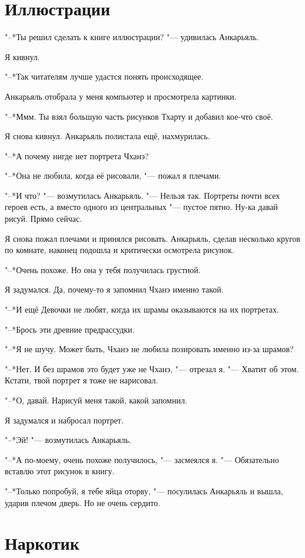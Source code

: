 \documentclass[a4paper,10pt]{book}
\newcommand{\ldotst}{\so{...}\xspace}
\begin{document}
\section{Иллюстрации}

"--*Ты решил сделать к книге иллюстрации? "--- удивилась Анкарьяль.

Я кивнул.

"--*Так читателям лучше удастся понять происходящее.

Анкарьяль отобрала у меня компьютер и просмотрела картинки.

"--*Ммм. Ты взял большую часть рисунков Тхарту и добавил кое-что своё.

Я снова кивнул. Анкарьяль полистала ещё, нахмурилась.

"--*А почему нигде нет портрета Чханэ?

"--*Она не любила, когда её рисовали, "--- пожал я плечами.

"--*И что? "--- возмутилась Анкарьяль. "--- Нельзя так. Портреты почти всех 
героев есть, а вместо одного из центральных "--- пустое пятно. Ну-ка давай 
рисуй. Прямо сейчас.

Я снова пожал плечами и принялся рисовать. Анкарьяль, сделав несколько кругов 
по комнате, наконец подошла и критически осмотрела рисунок.

"--*Очень похоже. Но она у тебя получилась грустной.

Я задумался. Да, почему-то я запомнил Чханэ именно такой.

"--*И ещё\ldotst Девочки не любят, когда их шрамы оказываются на их портретах.

"--*Брось эти древние предрассудки.

"--*Я не шучу. Может быть, Чханэ не любила позировать именно из-за шрамов?

"--*Нет. И без шрамов это будет уже не Чханэ, "--- отрезал я. "--- Хватит об 
этом. Кстати, твой портрет я тоже не нарисовал.

"--*О, давай. Нарисуй меня такой, какой запомнил.

Я задумался и набросал портрет.

"--*Эй! "--- возмутилась Анкарьяль.

"--*А по-моему, очень похоже получилось, "--- засмеялся я. "--- Обязательно 
вставлю этот рисунок в книгу.

"--*Только попробуй, я тебе яйца оторву, "--- посулилась Анкарьяль и вышла, 
ударив плечом дверь. Но не очень сердито.


\section{Наркотик}
\end{document}
